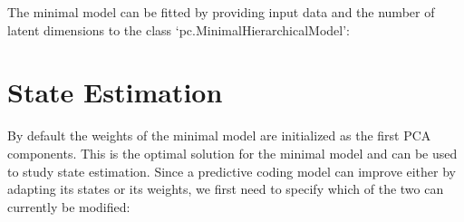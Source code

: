 \documentclass[letterpaper,10pt,english]{sphinxmanual}
\begin{document}
{
\begin{sphinxVerbatim}[commandchars=\\\{\}]
\llap{\color{nbsphinxin}[2]:\,\hspace{\fboxrule}\hspace{\fboxsep}}    
                                 
\end{sphinxVerbatim}
}

The minimal model can be fitted by providing input data and the number of latent dimensions to the class ‘pc.MinimalHierarchicalModel’:

{
\begin{sphinxVerbatim}[commandchars=\\\{\}]
\llap{\color{nbsphinxin}[3]:\,\hspace{\fboxrule}\hspace{\fboxsep}}    
                                    
\end{sphinxVerbatim}
}


\section{State Estimation}
\label{\detokenize{usage/minimal_model:State-Estimation}}
By default the weights of the minimal model are initialized as the first PCA components. This is the optimal solution for the minimal model and can be used to study state estimation. Since a predictive coding model can improve either by adapting its states or its weights, we first need to specify which of the two can currently be modified:

{
\begin{sphinxVerbatim}[commandchars=\\\{\}]
\llap{\color{nbsphinxin}[4]:\,\hspace{\fboxrule}\hspace{\fboxsep}}
\end{sphinxVerbatim}
}
\end{document}
